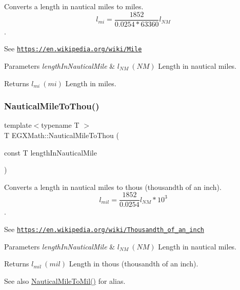Converts a length in nautical miles to miles. \[ l_{mi}=\frac{1852}{0.0254 * 63360} l_{NM} \]. 

See \href{https://en.wikipedia.org/wiki/Mile}{\tt https\+://en.\+wikipedia.\+org/wiki/\+Mile} 
\begin{DoxyParams}{Parameters}
{\em length\+In\+Nautical\+Mile} & $ l_{NM}\ (NM)$ Length in nautical miles. \\
\hline
\end{DoxyParams}
\begin{DoxyReturn}{Returns}
$ l_{mi}\ (mi)$ Length in miles. 
\end{DoxyReturn}
\mbox{\label{group___e_g_x_math-_conversions-_length_conversions-_non-_s_i-_nautical_mile-_imperial_ga2791d7d115ca8640a88ce3180db9dddb}} 
\subsubsection{\texorpdfstring{Nautical\+Mile\+To\+Thou()}{NauticalMileToThou()}}
{\footnotesize\ttfamily template$<$typename T $>$ \\
T E\+G\+X\+Math\+::\+Nautical\+Mile\+To\+Thou (\begin{DoxyParamCaption}\item[{const T}]{length\+In\+Nautical\+Mile }\end{DoxyParamCaption})}



Converts a length in nautical miles to thous (thousandth of an inch). \[ l_{mil}= \frac{1852}{0.0254} l_{NM} * 10^{3} \]. 

See \href{https://en.wikipedia.org/wiki/Thousandth_of_an_inch}{\tt https\+://en.\+wikipedia.\+org/wiki/\+Thousandth\+\_\+of\+\_\+an\+\_\+inch} 
\begin{DoxyParams}{Parameters}
{\em length\+In\+Nautical\+Mile} & $ l_{NM}\ (NM)$ Length in nautical miles. \\
\hline
\end{DoxyParams}
\begin{DoxyReturn}{Returns}
$ l_{mil}\ (mil)$ Length in thous (thousandth of an inch). 
\end{DoxyReturn}
\begin{DoxySeeAlso}{See also}
\mbox{\hyperlink{group___e_g_x_math-_conversions-_length_conversions-_non-_s_i-_nautical_mile-_imperial_ga30322f1dff254ba1eff05b0d10617fe7}{Nautical\+Mile\+To\+Mil()}} for alias. 
\end{DoxySeeAlso}
\mbox{\label{group___e_g_x_math-_conversions-_length_conversions-_non-_s_i-_nautical_mile-_imperial_ga649c499537b8934186bab8dcdee6d45e}} 
